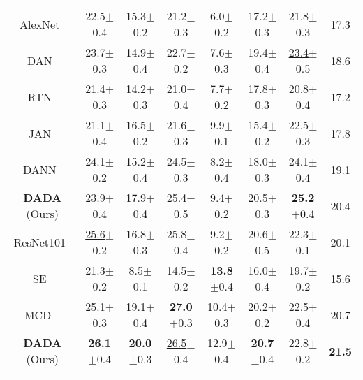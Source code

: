 \documentclass{article}
\begin{document}
\begin{table*}[t]
{\begin{tabular}{c c c c c c  c c}
 \Xhline{0.7pt} 
AlexNet~\cite{alexnet}& 22.5$\pm$0.4&15.3$\pm$0.2&21.2$\pm$0.3&6.0$\pm$0.2&17.2$\pm$0.3&21.8$\pm$0.3& 17.3\\
DAN~\cite{long2015} & 23.7$\pm$0.3 & 14.9$\pm$0.4 & 22.7$\pm$0.2 & 7.6$\pm$0.3& 19.4$\pm$0.4&\underline{23.4}$\pm$0.5 & 18.6 \\
RTN~\cite{RTN} & 21.4$\pm$0.3 & 14.2$\pm$0.3 & 21.0$\pm$0.4 & 7.7$\pm$0.2 & 17.8$\pm$0.3 &20.8$\pm$0.4  &17.2\\
JAN~\cite{JAN} &21.1$\pm$0.4&16.5$\pm$0.2&21.6$\pm$0.3&9.9$\pm$0.1&15.4$\pm$0.2&22.5$\pm$0.3&17.8\\
DANN~\cite{DANN}&24.1$\pm$0.2 & 15.2$\pm$0.4 & 24.5$\pm$0.3 & 8.2$\pm$0.4 & 18.0$\pm$0.3 &  24.1$\pm$0.4 & 19.1 \\
\textbf{DADA} (Ours) &23.9$\pm$0.4 & 17.9$\pm$0.4 & 25.4$\pm$0.5 & 9.4$\pm$0.2 &20.5$\pm$0.3& \textbf{25.2}$\pm$0.4 & 20.4\\
 \Xhline{1pt} 
 ResNet101~\cite{resnet}& \underline{25.6}$\pm$0.2 & 16.8$\pm$0.3 & 25.8$\pm$0.4 & 9.2$\pm$0.2 & 20.6$\pm$0.5 & 22.3$\pm$0.1 & 20.1  \\
SE~\cite{SE}&21.3$\pm$0.2&8.5$\pm$0.1 &14.5$\pm$0.2&\textbf{13.8}$\pm$0.4 &16.0$\pm$0.4&19.7$\pm$0.2 & 15.6  \\
MCD ~\cite{MCD_2018} & 25.1$\pm$0.3 & \underline{19.1}$\pm$0.4 & \textbf{27.0}$\pm$0.3 & 10.4$\pm$0.3 & 20.2$\pm$0.2 & 22.5$\pm$0.4 & 20.7  \\

\textbf{DADA} (Ours) & \textbf{26.1}$\pm$0.4 &\textbf{20.0}$\pm$0.3 & \underline{26.5}$\pm$0.4 & 12.9$\pm$0.4 & \textbf{20.7}$\pm$0.4 & 22.8$\pm$0.2 &\textbf{21.5}\\

                                  
\Xhline{1.0pt}
\end{tabular}
} 


\end{table*}
\end{document}
